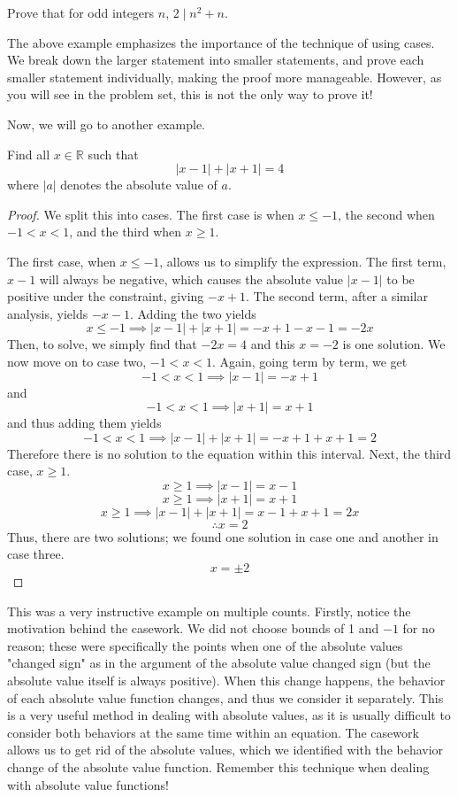 \begin{exercise}
    Prove that for odd integers $n$, $2 \mid n^2+n$.
\end{exercise}

The above example emphasizes the importance of the technique of using cases. We break down the larger statement into smaller statements, and prove each smaller statement individually, making the proof more manageable. However, as you will see in the problem set, this is not the only way to prove it!

Now, we will go to another example. 
\begin{example}
    Find all $x \in \mathbb{R}$ such that 
    \[
    |x-1| + |x+1| = 4
    \]
    where $|a|$ denotes the absolute value of $a$.
\end{example}
\begin{proof}
    We split this into cases. The first case is when $x \leq -1$, the second when $-1 < x < 1$, and the third when $x \geq 1$. 

    The first case, when $x \leq -1$, allows us to simplify the expression. The first term, $x-1$ will always be negative, which causes the absolute value $|x-1|$ to be positive under the constraint, giving $-x+1$. The second term, after a similar analysis, yields $-x-1$. Adding the two yields 
    \[
    x \leq -1 \implies |x-1|+|x+1|=-x+1-x-1=-2x 
    \]
    Then, to solve, we simply find that $-2x=4$ and this $x=-2$ is one solution. We now move on to case two, $-1 < x < 1$. Again, going term by term, we get
    \[
     -1 < x < 1 \implies |x-1| = -x+1
    \]
    and 
    \[
     -1 < x < 1 \implies |x+1| = x+1
    \]
    and thus adding them yields
    \[
     -1 < x < 1 \implies |x-1|+|x+1| = -x+1 + x + 1 = 2
    \]
    Therefore there is no solution to the equation within this interval. Next, the third case, $x \geq 1$.
    \[
    x \geq 1 \implies |x-1| = x-1
    \]
    \[
    x \geq 1 \implies |x+1| = x+1
    \]
    \[
    x \geq 1 \implies |x-1|+|x+1|= x-1 + x + 1 = 2x
    \]
    \[
    \therefore x = 2
    \]
    Thus, there are two solutions; we found one solution in case one and another in case three. 
    \[
    x = \pm 2
    \]
\end{proof}

This was a very instructive example on multiple counts. Firstly, notice the motivation behind the casework. We did not choose bounds of 1 and $-1$ for no reason; these were specifically the points when one of the absolute values "changed sign" as in the argument of the absolute value changed sign (but the absolute value itself is always positive). When this change happens, the behavior of each absolute value function changes, and thus we consider it separately. This is a very useful method in dealing with absolute values, as it is usually difficult to consider both behaviors at the same time within an equation. The casework allows us to get rid of the absolute values, which we identified with the behavior change of the absolute value function. Remember this technique when dealing with absolute value functions!

